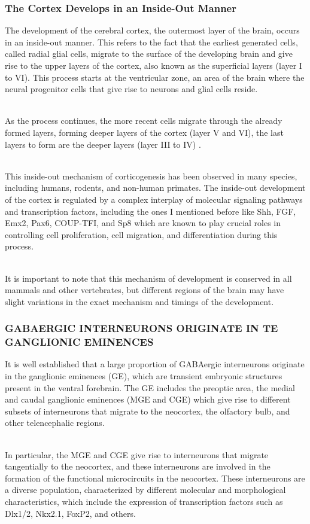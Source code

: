 \begin{itemize}
\begin{itemize}
\subsubsection{The Cortex Develops in an Inside-Out Manner}
The development of the cerebral cortex, the outermost layer of the brain, occurs in an inside-out manner. This refers to the fact that the earliest generated cells, called radial glial cells, migrate to the surface of the developing brain and give rise to the upper layers of the cortex, also known as the superficial layers (layer I to VI). This process starts at the ventricular zone, an area of the brain where the neural progenitor cells that give rise to neurons and glial cells reside.

\\As the process continues, the more recent cells migrate through the already formed layers, forming deeper layers of the cortex (layer V and VI), the last layers to form are the deeper layers (layer III to IV) .

\\This inside-out mechanism of corticogenesis has been observed in many species, including humans, rodents, and non-human primates. The inside-out development of the cortex is regulated by a complex interplay of molecular signaling pathways and transcription factors, including the ones I mentioned before like Shh, FGF, Emx2, Pax6, COUP-TFI, and Sp8 which are known to play crucial roles in controlling cell proliferation, cell migration, and differentiation during this process.

\\It is important to note that this mechanism of development is conserved in all mammals and other vertebrates, but different regions of the brain may have slight variations in the exact mechanism and timings of the development.
\subsubsection{GABAERGIC INTERNEURONS ORIGINATE IN TE GANGLIONIC EMINENCES}
It is well established that a large proportion of GABAergic interneurons originate in the ganglionic eminences (GE), which are transient embryonic structures present in the ventral forebrain. The GE includes the preoptic area, the medial and caudal ganglionic eminences (MGE and CGE) which give rise to different subsets of interneurons that migrate to the neocortex, the olfactory bulb, and other telencephalic regions.

\\In particular, the MGE and CGE give rise to interneurons that migrate tangentially to the neocortex, and these interneurons are involved in the formation of the functional microcircuits in the neocortex. These interneurons are a diverse population, characterized by different molecular and morphological characteristics, which include the expression of transcription factors such as Dlx1/2, Nkx2.1, FoxP2, and others.


\end{itemize}
\end{itemize}

